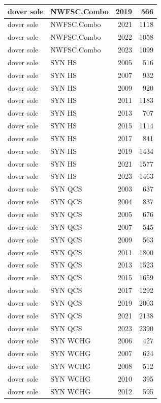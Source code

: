 \documentclass[
  letterpaper,
  DIV=11,
  numbers=noendperiod]{scrartcl}
\begin{document}
\begin{tabular}[t]{l|l|r|r}
\hline
dover sole & NWFSC.Combo & 2019 & 566\\
\hline
dover sole & NWFSC.Combo & 2021 & 1118\\
\hline
dover sole & NWFSC.Combo & 2022 & 1058\\
\hline
dover sole & NWFSC.Combo & 2023 & 1099\\
\hline
dover sole & SYN HS & 2005 & 516\\
\hline
dover sole & SYN HS & 2007 & 932\\
\hline
dover sole & SYN HS & 2009 & 920\\
\hline
dover sole & SYN HS & 2011 & 1183\\
\hline
dover sole & SYN HS & 2013 & 707\\
\hline
dover sole & SYN HS & 2015 & 1114\\
\hline
dover sole & SYN HS & 2017 & 841\\
\hline
dover sole & SYN HS & 2019 & 1434\\
\hline
dover sole & SYN HS & 2021 & 1577\\
\hline
dover sole & SYN HS & 2023 & 1463\\
\hline
dover sole & SYN QCS & 2003 & 637\\
\hline
dover sole & SYN QCS & 2004 & 837\\
\hline
dover sole & SYN QCS & 2005 & 676\\
\hline
dover sole & SYN QCS & 2007 & 545\\
\hline
dover sole & SYN QCS & 2009 & 563\\
\hline
dover sole & SYN QCS & 2011 & 1800\\
\hline
dover sole & SYN QCS & 2013 & 1523\\
\hline
dover sole & SYN QCS & 2015 & 1659\\
\hline
dover sole & SYN QCS & 2017 & 1292\\
\hline
dover sole & SYN QCS & 2019 & 2003\\
\hline
dover sole & SYN QCS & 2021 & 2138\\
\hline
dover sole & SYN QCS & 2023 & 2390\\
\hline
dover sole & SYN WCHG & 2006 & 427\\
\hline
dover sole & SYN WCHG & 2007 & 624\\
\hline
dover sole & SYN WCHG & 2008 & 512\\
\hline
dover sole & SYN WCHG & 2010 & 395\\
\hline
dover sole & SYN WCHG & 2012 & 595\\
\hline

\end{tabular}
\end{document}
